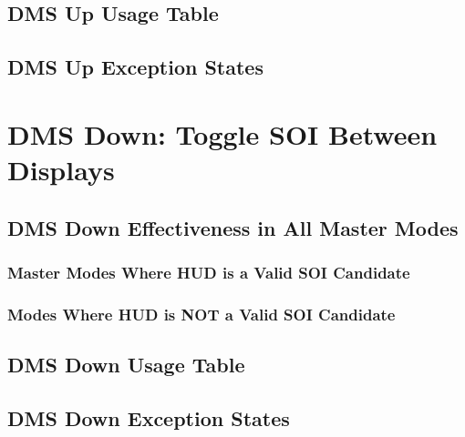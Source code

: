 \documentclass[11pt, a4paper, twoside]{report}
\begin{document}
\subsection{DMS Up Usage Table}
\label{sec:C4-S2-S2}

\subsection{DMS Up Exception States}
\label{sec:C4-S2-S3}

\section{DMS Down: Toggle SOI Between Displays}
\label{sec:C4-S3}

\subsection{DMS Down Effectiveness in All Master Modes}
\label{sec:C4-S3-S1}


\subsubsection{Master Modes Where HUD is a Valid SOI Candidate}
\label{sec:C4-S3-S1-S1}

\subsubsection{Modes Where HUD is NOT a Valid SOI Candidate}
\label{sec:C4-S3-S1-S2}

\subsection{DMS Down Usage Table}
\label{sec:C4-S3-S2}

\subsection{DMS Down Exception States}
\label{sec:C4-S3-S3}
\end{document}
